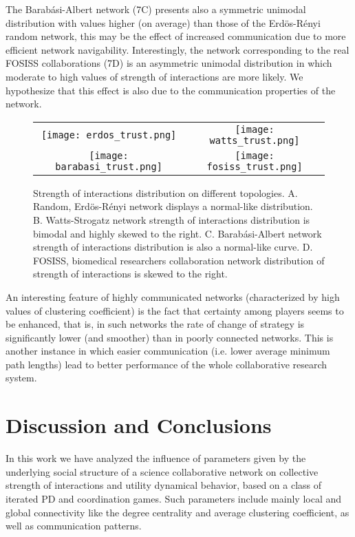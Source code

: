 \documentclass[11pt]{article}
\begin{document}
The Barab\'asi-Albert network (7C) presents also a symmetric unimodal
distribution with values higher (on average) than those of the Erd\"{o}s-R\'enyi
random network, this may be the effect of increased communication due to more
efficient network navigability. Interestingly, the network corresponding to the
real FOSISS collaborations (7D) is an asymmetric unimodal distribution in which
moderate to high values of strength of interactions are more likely. We 
hypothesize that this effect is also due to the communication properties of the
network. 

\begin{figure} [h!]
\centering
\begin{tabular}{cc}

\texttt{[image: erdos\_trust.png]} & 
\texttt{[image: watts\_trust.png]} \\
\texttt{[image: barabasi\_trust.png]} & 
\texttt{[image: fosiss\_trust.png]}
\end{tabular}
\caption{Strength of interactions distribution on different topologies. A. Random, Erd\"{o}s-R\'enyi network displays a normal-like
  distribution. B. Watts-Strogatz network strength of interactions distribution is bimodal and highly skewed to the right. C.
  Barab\'asi-Albert network strength of interactions distribution is also a normal-like curve. D. FOSISS, biomedical researchers
  collaboration network distribution of strength of interactions is skewed to
  the right.}\label{histo_trust}  
\end{figure}

\FloatBarrier

An interesting feature of highly communicated networks (characterized by high values of clustering coefficient) is the
fact that certainty among players seems to be enhanced, that is, in such networks the rate of change of strategy is
significantly lower (and smoother) than in poorly connected networks. This is another instance in which easier
communication (i.e. lower average minimum path lengths) lead to better performance of the whole collaborative research
system.\\ 


\section{Discussion and Conclusions}
\label{sec:3}

{\color{red}In this work we have analyzed the influence of parameters given by the underlying social structure of a science
collaborative network on collective strength of interactions and utility dynamical behavior, based on a class of iterated
PD and coordination games. Such parameters include mainly local and global connectivity like the degree centrality and
average clustering coefficient, as well as communication patterns.}\\
\end{document}
